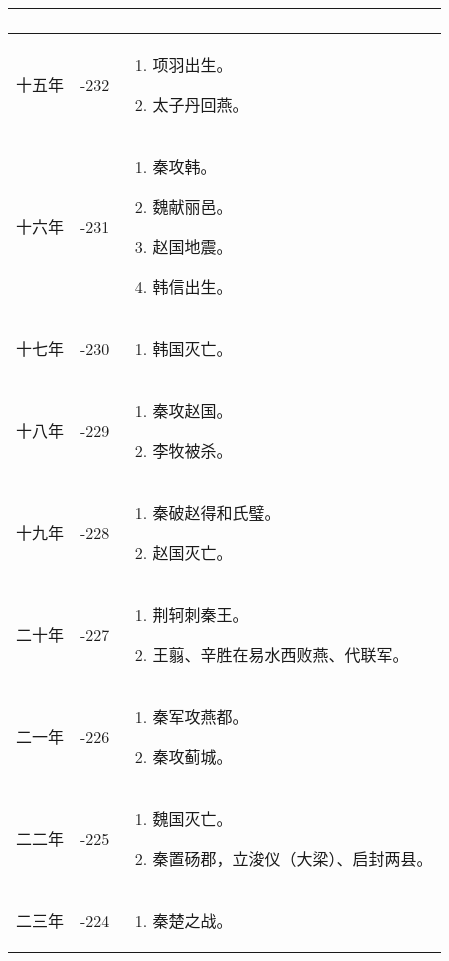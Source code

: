 \begin{longtable}{|>{\centering\scriptsize}m{2em}|>{\centering\scriptsize}m{1.3em}|>{\centering}m{9em}|}
\begin{enumerate}
  \end{enumerate} \tabularnewline\hline
  十五年 & -232 & \begin{enumerate}
    \tiny
  \item 项羽出生。
  \item 太子丹回燕。
  \end{enumerate} \tabularnewline\hline
  十六年 & -231 & \begin{enumerate}
    \tiny
  \item 秦攻韩。
  \item 魏献丽邑。
  \item 赵国地震。
  \item 韩信出生。
  \end{enumerate} \tabularnewline\hline
  十七年 & -230 & \begin{enumerate}
    \tiny
  \item 韩国灭亡。
  \end{enumerate} \tabularnewline\hline
  十八年 & -229 & \begin{enumerate}
    \tiny
  \item 秦攻赵国。
  \item 李牧被杀。
  \end{enumerate} \tabularnewline\hline
  十九年 & -228 & \begin{enumerate}
    \tiny
  \item 秦破赵得和氏璧。
  \item 赵国灭亡。
  \end{enumerate} \tabularnewline\hline
  二十年 & -227 & \begin{enumerate}
    \tiny
  \item 荆轲刺秦王。
  \item 王翦、辛胜在易水西败燕、代联军。
  \end{enumerate} \tabularnewline\hline
  二一年 & -226 & \begin{enumerate}
    \tiny
  \item 秦军攻燕都。
  \item 秦攻蓟城。
  \end{enumerate} \tabularnewline\hline
  二二年 & -225 & \begin{enumerate}
    \tiny
  \item 魏国灭亡。
  \item 秦置砀郡，立浚仪（大梁）、启封两县。
  \end{enumerate} \tabularnewline\hline
  二三年 & -224 & \begin{enumerate}
    \tiny
  \item 秦楚之战。

\end{enumerate}
\end{longtable}
